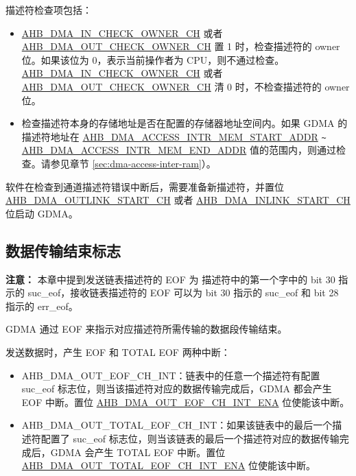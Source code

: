 \documentclass[main\_\_CN.tex]{subfiles}
\begin{document}
描述符检查项包括：
\begin{itemize}
    \item \hyperref[fielddesc:AHBDMAINCHECKOWNERCHN]{AHB\_DMA\_IN\_CHECK\_OWNER\_CH} 或者 \hyperref[fielddesc:AHBDMAOUTCHECKOWNERCHN]{AHB\_DMA\_OUT\_CHECK\_OWNER\_CH} 置 1 时，检查描述符的 owner 位。如果该位为 0，表示当前操作者为 CPU，则不通过检查。\hyperref[fielddesc:AHBDMAINCHECKOWNERCHN]{AHB\_DMA\_IN\_CHECK\_OWNER\_CH} 或者 \hyperref[fielddesc:AHBDMAOUTCHECKOWNERCHN]{AHB\_DMA\_OUT\_CHECK\_OWNER\_CH} 清 0 时，不检查描述符的 owner 位。\\

    \item 检查描述符本身的存储地址是否在配置的存储器地址空间内。如果 GDMA 的描述符地址在 \hyperref[fielddesc:AHBDMAACCESSINTRMEMSTARTADDR]{AHB\_DMA\_ACCESS\_INTR\_MEM\_START\_ADDR} \verb+~+ \hyperref[fielddesc:AHBDMAACCESSINTRMEMENDADDR]{AHB\_DMA\_ACCESS\_INTR\_MEM\_END\_ADDR} 值的范围内，则通过检查。请参见章节 \ref{sec:dma-access-inter-ram}）。\\
\end{itemize}

软件在检查到通道描述符错误中断后，需要准备新描述符，并置位 \hyperref[fielddesc:AHBDMAOUTLINKSTARTCHN]{AHB\_DMA\_OUTLINK\_START\_CH} 或者  \hyperref[fielddesc:AHBDMAINLINKSTARTCHN]{AHB\_DMA\_INLINK\_START\_CH} 位启动 GDMA。


\subsection{数据传输结束标志}

{\bfseries 注意：} 本章中提到发送链表描述符的 EOF 为 描述符中的第一个字中的 bit 30 指示的 suc\_eof，接收链表描述符的 EOF 可以为 bit 30 指示的 suc\_eof 和 bit 28 指示的 err\_eof。

GDMA 通过 EOF 来指示对应描述符所需传输的数据段传输结束。

发送数据时，产生 EOF 和 TOTAL EOF 两种中断：
\begin{itemize}
    \item AHB\_DMA\_OUT\_EOF\_CH\_INT：链表中的任意一个描述符有配置 suc\_eof 标志位，则当该描述符对应的数据传输完成后，GDMA 都会产生 EOF 中断。置位 \hyperref[fielddesc:AHBDMAOUTEOFCHNINTENA]{AHB\_DMA\_OUT\_EOF\_CH\_INT\_ENA} 位使能该中断。
    \item AHB\_DMA\_OUT\_TOTAL\_EOF\_CH\_INT：如果该链表中的最后一个描述符配置了 suc\_eof 标志位，则当该链表的最后一个描述符对应的数据传输完成后，GDMA 会产生 TOTAL EOF 中断。置位 \hyperref[fielddesc:AHBDMAOUTTOTALEOFCHNINTENA]{AHB\_DMA\_OUT\_TOTAL\_EOF\_CH\_INT\_ENA} 位使能该中断。
\end{itemize}
\end{document}
